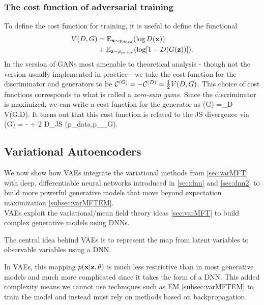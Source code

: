 \subsubsection{The cost function of adversarial training}
\label{subsubsec:vaeGanAdversarialCostfct}
To define the cost function for training, it is useful to define the functional
\begin{align}
	\label{eq:vaeGanCostfct1}
	V(D,G) &= \mathbb{E}_{\mathbf{x} \sim p_{data}} (\log D(\mathbf{x})) \nonumber \\
	&+ \mathbb{E}_{\mathbf{z}\sim p_{prior}} (\log[1-D(G(\mathbf{z}))]).
\end{align}
In the version of GANs most amenable to theoretical analysis - though not the version usually implemented in practice - we take the cost function for the discriminator and generators to be $\mathcal{C}^{(G)}=-\mathcal{C}^{(D)} = \frac{1}{2} V(D,G)$. This choice of cost functions corresponds to what is called a \emph{zero-sum game}. Since the discriminator is maximized, we can write a cost function for the generator as
\be 
\mC(G) =\max_D V(G,D). 
\ee 
It turns out that this cost function is related to the JS divergence via
\be 
\mC(G) = - + 2 D_{JS} (p_{data},p_{\theta_G}).
\ee








\subsection{Variational Autoencoders}
\label{subsec:vaeGanVAEs}
We now show how VAEs integrate the variational methods from \ref{sec:varMFT} with deep, differentiable neural networks introduced in \ref{sec:dnn} and \ref{sec:dnn2} to build more powerful generative models that move beyond expectation maximization \ref{subsec:varMFTEM}.\\
VAEs exploit the variational/mean field theory ideas \ref{sec:varMFT} to build complex generative models using DNNs. 
\begin{mybox}{}
	The central idea behind VAEs is to represent the map from latent variables to observable variables using a DNN.
\end{mybox}
In VAEs, this mapping $p(\mathbf{x} |\mathbf{z},\theta)$ is much less restrictive than in most generative models and much more complicated since it takes the form of a DNN. This added complexity means we cannot use techniques such as EM \ref{subsec:varMFTEM} to train the model and instead must rely on methods based on backpropagation.

